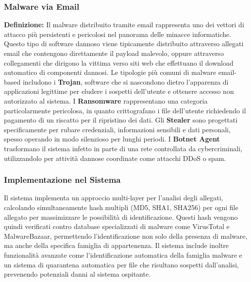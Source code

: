\documentclass{article}
\begin{document}
\subsubsection{Malware via Email}
\textbf{Definizione:} Il malware distribuito tramite email rappresenta uno dei vettori di attacco più persistenti e pericolosi nel panorama delle minacce informatiche. Questo tipo di software dannoso viene tipicamente distribuito attraverso allegati email che contengono direttamente il payload malevolo, oppure attraverso collegamenti che dirigono la vittima verso siti web che effettuano il download automatico di componenti dannosi.
\newline \newline
Le tipologie più comuni di malware email-based includono i \textbf{Trojan}, software che si nascondono dietro l'apparenza di applicazioni legittime per eludere i sospetti dell'utente e ottenere accesso non autorizzato al sistema. I \textbf{Ransomware} rappresentano una categoria particolarmente pericolosa, in quanto crittografano i file dell'utente richiedendo il pagamento di un riscatto per il ripristino dei dati.
\newline \newline
Gli \textbf{Stealer} sono progettati specificamente per rubare credenziali, informazioni sensibili e dati personali, spesso operando in modo silenzioso per lunghi periodi. I \textbf{Botnet Agent} trasformano il sistema infetto in parte di una rete controllata da cybercriminali, utilizzandolo per attività dannose coordinate come attacchi DDoS o spam.

\subsubsection{Implementazione nel Sistema}

Il sistema implementa un approccio multi-layer per l'analisi degli allegati, calcolando simultaneamente hash multipli (MD5, SHA1, SHA256) per ogni file allegato per massimizzare le possibilità di identificazione. Questi hash vengono quindi verificati contro database specializzati di malware come VirusTotal e MalwareBazaar, permettendo l'identificazione non solo della presenza di malware, ma anche della specifica famiglia di appartenenza.
\newline \newline
Il sistema include inoltre funzionalità avanzate come l'identificazione automatica della famiglia malware e un sistema di quarantena automatica per file che risultano sospetti dall'analisi, prevenendo potenziali danni al sistema ospitante.
\end{document}
